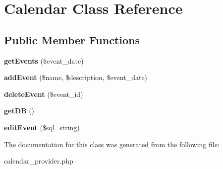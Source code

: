 \hypertarget{class_calendar}{}\section{Calendar Class Reference}
\label{class_calendar}
\subsection*{Public Member Functions}
\begin{DoxyCompactItemize}
\item 
\hypertarget{class_calendar_a5646ba36c98eefc1fe347775f0ef9a66}{}\label{class_calendar_a5646ba36c98eefc1fe347775f0ef9a66} 
{\bfseries get\+Events} (\$event\+\_\+date)
\item 
\hypertarget{class_calendar_a50787bd51ce77d2bf95c9dde0f7d296b}{}\label{class_calendar_a50787bd51ce77d2bf95c9dde0f7d296b} 
{\bfseries add\+Event} (\$name, \$description, \$event\+\_\+date)
\item 
\hypertarget{class_calendar_ae950e0dd29caf717545b5cee106a2977}{}\label{class_calendar_ae950e0dd29caf717545b5cee106a2977} 
{\bfseries delete\+Event} (\$event\+\_\+id)
\item 
\hypertarget{class_calendar_a4162847310de81b83504109485866a7c}{}\label{class_calendar_a4162847310de81b83504109485866a7c} 
{\bfseries get\+DB} ()
\item 
\hypertarget{class_calendar_a0fac67b9ba33aca03fd660f583e66ead}{}\label{class_calendar_a0fac67b9ba33aca03fd660f583e66ead} 
{\bfseries edit\+Event} (\$sql\+\_\+string)
\end{DoxyCompactItemize}


The documentation for this class was generated from the following file\+:\begin{DoxyCompactItemize}
\item 
calendar\+\_\+provider.\+php\end{DoxyCompactItemize}
